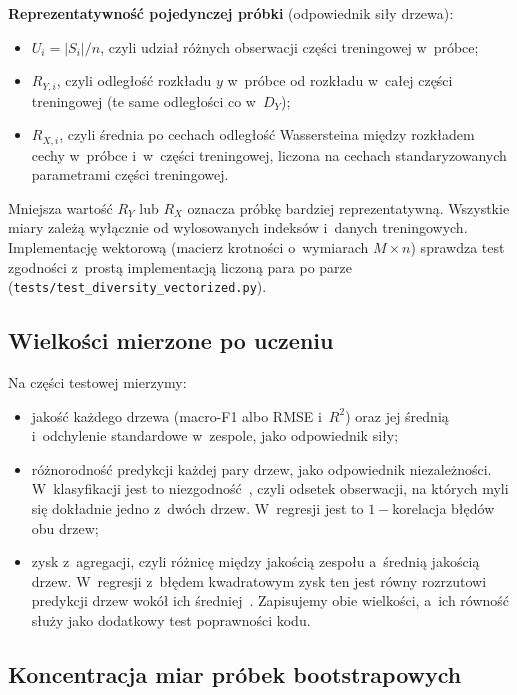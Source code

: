 \documentclass[11pt,a4paper]{article}
\begin{document}
\textbf{Reprezentatywność pojedynczej próbki} (odpowiednik siły drzewa):
\begin{itemize}
  \item $U_i=|S_i|/n$, czyli udział różnych obserwacji części treningowej w~próbce;
  \item $R_{Y,i}$, czyli odległość rozkładu $y$ w~próbce od rozkładu w~całej części treningowej (te same odległości co w~$D_Y$);
  \item $R_{X,i}$, czyli średnia po cechach odległość Wassersteina między rozkładem cechy w~próbce i~w~części treningowej, liczona na cechach standaryzowanych parametrami części treningowej.
\end{itemize}
Mniejsza wartość $R_Y$ lub $R_X$ oznacza próbkę bardziej reprezentatywną. Wszystkie miary zależą wyłącznie od wylosowanych indeksów i~danych treningowych. Implementację wektorową (macierz krotności o~wymiarach $M\times n$) sprawdza test zgodności z~prostą implementacją liczoną para po parze (\texttt{tests/test\_diversity\_vectorized.py}).

\subsection{Wielkości mierzone po uczeniu}

Na części testowej mierzymy:
\begin{itemize}
  \item jakość każdego drzewa (macro-F1 albo RMSE i~$R^2$) oraz jej średnią i~odchylenie standardowe w~zespole, jako odpowiednik siły;
  \item różnorodność predykcji każdej pary drzew, jako odpowiednik niezależności. W~klasyfikacji jest to niezgodność~\cite{kuncheva2003}, czyli odsetek obserwacji, na których myli się dokładnie jedno z~dwóch drzew. W~regresji jest to $1-$korelacja błędów obu drzew;
  \item zysk z~agregacji, czyli różnicę między jakością zespołu a~średnią jakością drzew. W~regresji z~błędem kwadratowym zysk ten jest równy rozrzutowi predykcji drzew wokół ich średniej~\cite{krogh1995}. Zapisujemy obie wielkości, a~ich równość służy jako dodatkowy test poprawności kodu.
\end{itemize}

\subsection{Koncentracja miar próbek bootstrapowych}
\label{sec:koncentracja}
\end{document}
